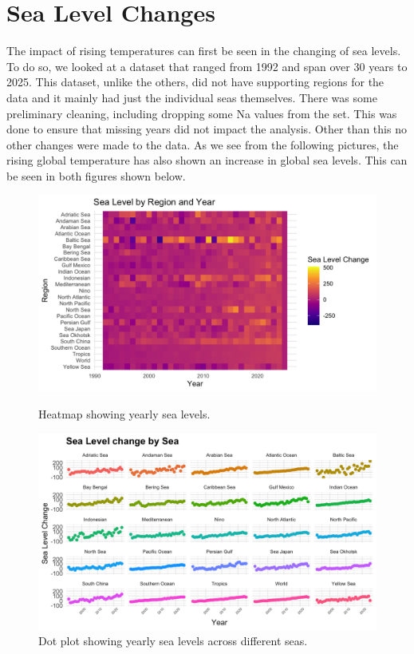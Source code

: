 \documentclass[10pt]{article}
\begin{document}
\section{Sea Level Changes}  
\label{SeaChange}
The impact of rising temperatures can first be seen in the changing of sea levels. To do so, we looked at a dataset that ranged from 1992 and span over 30 years to 2025. This dataset, unlike the others, did not have supporting regions for the data and it mainly had just the individual seas themselves. There was some preliminary cleaning, including dropping some Na values from the set. This was done to ensure that missing years did not impact the analysis. Other than this no other changes were made to the data. As we see from the following pictures, the rising global temperature has also shown an increase in global sea levels. This can be seen in both figures shown below. 

\begin{figure}[H]
    \centering
    \begin{minipage}{0.48\textwidth}
        \centering
        \includegraphics[width=\linewidth]{Sea_level_changed_x.png}
        \caption{Heatmap showing yearly sea levels.}
        \label{fig:sealevelheat}
    \end{minipage}
    \hfill
    \begin{minipage}{0.48\textwidth}
        \centering
        \includegraphics[width=\linewidth]{Sea_level_dot_x.png}
        \caption{Dot plot showing yearly sea levels across different seas.}
        \label{fig:sealeveldots}
    \end{minipage}
\end{figure}
\end{document}
